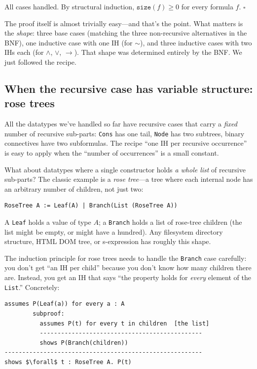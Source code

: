 \documentclass[11pt]{article}
\begin{document}
All cases handled. By structural induction, $\texttt{size}(f) \geq 0$ for every formula $f$. $\square$

The proof itself is almost trivially easy---and that's the point. What matters is the \emph{shape}: three base cases (matching the three non-recursive alternatives in the BNF), one inductive case with one IH (for ${\sim}$), and three inductive cases with two IHs each (for $\wedge$, $\vee$, $\to$). That shape was determined entirely by the BNF. We just followed the recipe.

\subsection*{When the recursive case has variable structure: rose trees}

All the datatypes we've handled so far have recursive cases that carry a \emph{fixed} number of recursive sub-parts: \texttt{Cons} has one tail, \texttt{Node} has two subtrees, binary connectives have two subformulas. The recipe ``one IH per recursive occurrence'' is easy to apply when the ``number of occurrences'' is a small constant.

What about datatypes where a single constructor holds \emph{a whole list} of recursive sub-parts? The classic example is a \emph{rose tree}---a tree where each internal node has an arbitrary number of children, not just two:
\begin{lstlisting}
RoseTree A := Leaf(A) | Branch(List (RoseTree A))
\end{lstlisting}
A \texttt{Leaf} holds a value of type $A$; a \texttt{Branch} holds a list of rose-tree children (the list might be empty, or might have a hundred). Any filesystem directory structure, HTML DOM tree, or s-expression has roughly this shape.

The induction principle for rose trees needs to handle the \texttt{Branch} case carefully: you don't get ``an IH per child'' because you don't know how many children there are. Instead, you get an IH that says ``the property holds for \emph{every} element of the \texttt{List}.'' Concretely:

\begin{lstlisting}
assumes P(Leaf(a)) for every a : A
        subproof:
          assumes P(t) for every t in children  [the list]
          ----------------------------------------------
          shows P(Branch(children))
--------------------------------------------------------
shows $\forall$ t : RoseTree A. P(t)
\end{lstlisting}
\end{document}
